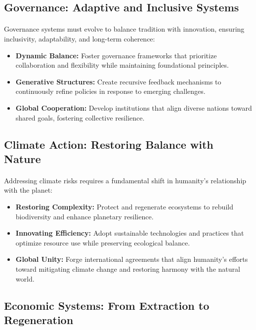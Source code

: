 \documentclass[12pt]{article}
\begin{document}
\subsection{Governance: Adaptive and Inclusive Systems}
\paragraph{}
Governance systems must evolve to balance tradition with innovation, ensuring inclusivity, adaptability, and long-term coherence:
\begin{itemize}
    \item \textbf{Dynamic Balance:} Foster governance frameworks that prioritize collaboration and flexibility while maintaining foundational principles.
    \item \textbf{Generative Structures:} Create recursive feedback mechanisms to continuously refine policies in response to emerging challenges.
    \item \textbf{Global Cooperation:} Develop institutions that align diverse nations toward shared goals, fostering collective resilience.
\end{itemize}

\subsection{Climate Action: Restoring Balance with Nature}
\paragraph{}
Addressing climate risks requires a fundamental shift in humanity’s relationship with the planet:
\begin{itemize}
    \item \textbf{Restoring Complexity:} Protect and regenerate ecosystems to rebuild biodiversity and enhance planetary resilience.
    \item \textbf{Innovating Efficiency:} Adopt sustainable technologies and practices that optimize resource use while preserving ecological balance.
    \item \textbf{Global Unity:} Forge international agreements that align humanity’s efforts toward mitigating climate change and restoring harmony with the natural world.
\end{itemize}

\subsection{Economic Systems: From Extraction to Regeneration}
\end{document}
